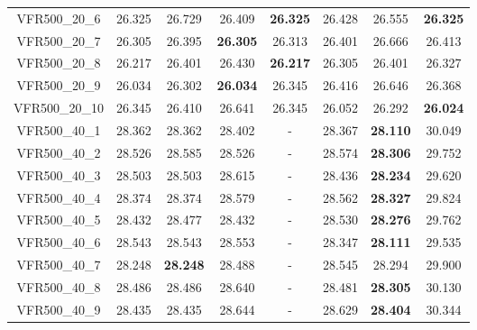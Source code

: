 \begin{tabular}{cc|ccc|ccc}
VFR500\_20\_6      & 26.325           & 26.729           & 26.409           & {\bf 26.325}     & 26.428           & 26.555           & {\bf 26.325}    \\ 
VFR500\_20\_7      & 26.305           & 26.395           & {\bf 26.305}     & 26.313           & 26.401           & 26.666           & 26.413          \\ 
VFR500\_20\_8      & 26.217           & 26.401           & 26.430           & {\bf 26.217}     & 26.305           & 26.401           & 26.327          \\ 
VFR500\_20\_9      & 26.034           & 26.302           & {\bf 26.034}     & 26.345           & 26.416           & 26.646           & 26.368          \\ 
VFR500\_20\_10     & 26.345           & 26.410           & 26.641           & 26.345           & 26.052           & 26.292           & {\bf 26.024}    \\ 
VFR500\_40\_1      & 28.362           & 28.362           & 28.402           & -                & 28.367           & {\bf 28.110}     & 30.049          \\ 
VFR500\_40\_2      & 28.526           & 28.585           & 28.526           & -                & 28.574           & {\bf 28.306}     & 29.752          \\ 
VFR500\_40\_3      & 28.503           & 28.503           & 28.615           & -                & 28.436           & {\bf 28.234}     & 29.620          \\ 
VFR500\_40\_4      & 28.374           & 28.374           & 28.579           & -                & 28.562           & {\bf 28.327}     & 29.824          \\ 
VFR500\_40\_5      & 28.432           & 28.477           & 28.432           & -                & 28.530           & {\bf 28.276}     & 29.762          \\ 
VFR500\_40\_6      & 28.543           & 28.543           & 28.553           & -                & 28.347           & {\bf 28.111}     & 29.535          \\ 
VFR500\_40\_7      & 28.248           & {\bf 28.248}     & 28.488           & -                & 28.545           & 28.294           & 29.900          \\ 
VFR500\_40\_8      & 28.486           & 28.486           & 28.640           & -                & 28.481           & {\bf 28.305}     & 30.130          \\ 
VFR500\_40\_9      & 28.435           & 28.435           & 28.644           & -                & 28.629           & {\bf 28.404}     & 30.344          \\ 

\end{tabular}
